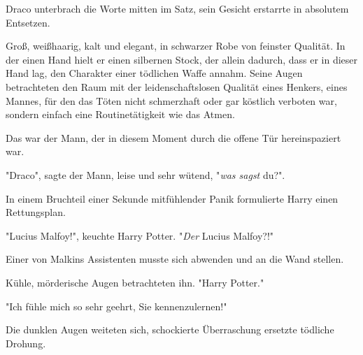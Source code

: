 Draco unterbrach die Worte mitten im Satz, sein Gesicht erstarrte in absolutem Entsetzen. 

Groß, weißhaarig, kalt und elegant, in schwarzer Robe von feinster Qualität. In der einen Hand hielt er einen silbernen Stock, der allein dadurch, dass er in dieser Hand lag, den Charakter einer tödlichen Waffe annahm. Seine Augen betrachteten den Raum mit der leidenschaftslosen Qualität eines Henkers, eines Mannes, für den das Töten nicht schmerzhaft oder gar köstlich verboten war, sondern einfach eine Routinetätigkeit wie das Atmen. 

Das war der Mann, der in diesem Moment durch die offene Tür hereinspaziert war.

"Draco", sagte der Mann, leise und sehr wütend, "\emph{was sagst} du?". 

In einem Bruchteil einer Sekunde mitfühlender Panik formulierte Harry einen Rettungsplan.

"Lucius Malfoy!", keuchte Harry Potter. "\emph{Der} Lucius Malfoy?!" 

Einer von Malkins Assistenten musste sich abwenden und an die Wand stellen.

Kühle, mörderische Augen betrachteten ihn. "Harry Potter."

"Ich fühle mich so sehr geehrt, Sie kennenzulernen!" 

Die dunklen Augen weiteten sich, schockierte Überraschung ersetzte tödliche Drohung. 

